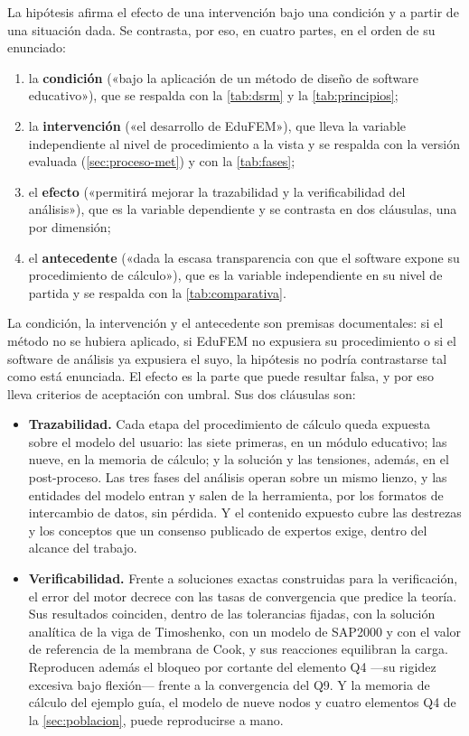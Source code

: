 La hipótesis afirma el efecto de una intervención bajo una condición y a partir de una situación dada. Se contrasta, por eso, en cuatro partes, en el orden de su enunciado:
\begin{enumerate}
    \item la \textbf{condición} («bajo la aplicación de un método de diseño de software educativo»), que se respalda con la \autoref{tab:dsrm} y la \autoref{tab:principios};
    \item la \textbf{intervención} («el desarrollo de EduFEM»), que lleva la variable independiente al nivel de procedimiento a la vista y se respalda con la versión evaluada (\autoref{sec:proceso-met}) y con la \autoref{tab:fases};
    \item el \textbf{efecto} («permitirá mejorar la trazabilidad y la verificabilidad del análisis»), que es la variable dependiente y se contrasta en dos cláusulas, una por dimensión;
    \item el \textbf{antecedente} («dada la escasa transparencia con que el software expone su procedimiento de cálculo»), que es la variable independiente en su nivel de partida y se respalda con la \autoref{tab:comparativa}.
\end{enumerate}
La condición, la intervención y el antecedente son premisas documentales: si el método no se hubiera aplicado, si EduFEM no expusiera su procedimiento o si el software de análisis ya expusiera el suyo, la hipótesis no podría contrastarse tal como está enunciada. El efecto es la parte que puede resultar falsa, y por eso lleva criterios de aceptación con umbral. Sus dos cláusulas son:
\begin{itemize}
    \item[(a)] \textbf{Trazabilidad.} Cada etapa del procedimiento de cálculo queda expuesta sobre el modelo del usuario: las siete primeras, en un módulo educativo; las nueve, en la memoria de cálculo; y la solución y las tensiones, además, en el post-proceso. Las tres fases del análisis operan sobre un mismo lienzo, y las entidades del modelo entran y salen de la herramienta, por los formatos de intercambio de datos, sin pérdida. Y el contenido expuesto cubre las destrezas y los conceptos que un consenso publicado de expertos exige, dentro del alcance del trabajo.
    \item[(b)] \textbf{Verificabilidad.} Frente a soluciones exactas construidas para la verificación, el error del motor decrece con las tasas de convergencia que predice la teoría. Sus resultados coinciden, dentro de las tolerancias fijadas, con la solución analítica de la viga de Timoshenko, con un modelo de SAP2000 y con el valor de referencia de la membrana de Cook, y sus reacciones equilibran la carga. Reproducen además el bloqueo por cortante del elemento Q4 ---su rigidez excesiva bajo flexión--- frente a la convergencia del Q9. Y la memoria de cálculo del ejemplo guía, el modelo de nueve nodos y cuatro elementos Q4 de la \autoref{sec:poblacion}, puede reproducirse a mano.
\end{itemize}
